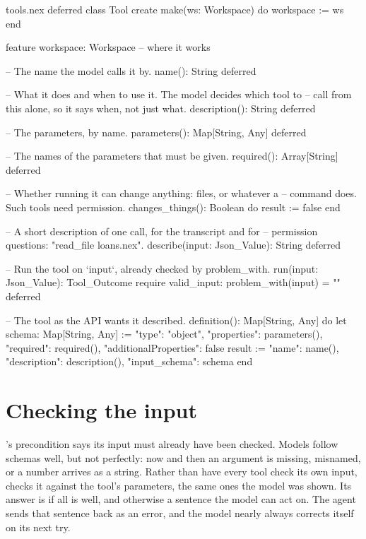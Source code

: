 \begin{append}{tools.nex}
deferred class Tool
create
  make(ws: Workspace) do
    workspace := ws
  end

feature
  workspace: Workspace    -- where it works

  -- The name the model calls it by.
  name(): String deferred

  -- What it does and when to use it. The model decides which tool to
  -- call from this alone, so it says when, not just what.
  description(): String deferred

  -- The parameters, by name.
  parameters(): Map[String, Any] deferred

  -- The names of the parameters that must be given.
  required(): Array[String] deferred

  -- Whether running it can change anything: files, or whatever a
  -- command does. Such tools need permission.
  changes_things(): Boolean do
    result := false
  end

  -- A short description of one call, for the transcript and for
  -- permission questions: "read_file loans.nex".
  describe(input: Json_Value): String deferred

  -- Run the tool on `input`, already checked by problem_with.
  run(input: Json_Value): Tool_Outcome
  require
    valid_input: problem_with(input) = ""
  deferred

  -- The tool as the API wants it described.
  definition(): Map[String, Any] do
    let schema: Map[String, Any] := {"type": "object", "properties": parameters(),
      "required": required(), "additionalProperties": false}
    result := {"name": name(), "description": description(), "input_schema": schema}
  end
\end{append}

\section{Checking the input}

's precondition says its input must already have been checked.
Models follow schemas well, but not perfectly: now and then an argument is
missing, misnamed, or a number arrives as a string. Rather than have every
tool check its own input,  checks it against the tool's
parameters, the same ones the model was shown. Its answer is  if
all is well, and otherwise a sentence the model can act on. The agent
sends that sentence back as an error, and the model nearly always corrects
itself on its next try.

